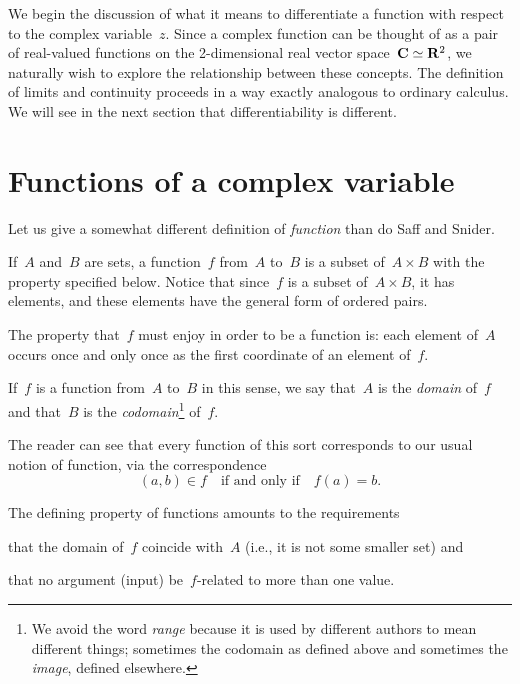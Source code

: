 \documentclass[twocolumn,12pt]{article}
\date{March 1, 2013 (Fri)}
\begin{document}
\makeheader

\begin{summary}
We begin the discussion of what it means to differentiate a function with respect to the complex variable~$z$. Since a complex function can be thought of as a pair of real-valued functions on the 2-dimensional real vector space~$\mathbf{C} \simeq \mathbf{R}^2$, we naturally wish to explore the relationship between these concepts. The definition of limits and continuity proceeds in a way exactly analogous to ordinary calculus. We will see in the next section that differentiability is different.
\end{summary}

\section{Functions of a complex variable}
Let us give a somewhat different definition of \emph{function} than do Saff and Snider.
\begin{definition}
  If~$A$ and~$B$ are sets, a function~$f$ from~$A$ to~$B$ is a subset of~$A \times B$ with the property specified below. Notice that since~$f$ is a subset of~$A \times B$, it has elements, and these elements have the general form of ordered pairs.
  
  The property that~$f$ must enjoy in order to be a function is: each element of~$A$ occurs once and only once as the first coordinate of an element of~$f$.

  If~$f$ is a function from~$A$ to~$B$ in this sense, we say that~$A$ is the \emph{domain} of~$f$ and that~$B$ is the \emph{codomain}\footnote{We avoid the word \emph{range} because it is used by different authors to mean different things; sometimes the codomain as defined above and sometimes the \emph{image}, defined elsewhere.} of~$f$.
\end{definition}
The reader can see that every function of this sort corresponds to our usual notion of function, via the correspondence
\[
  (a, b) \in f \quad \text{if and only if} \quad f(a) = b.
\]
 
The defining property of functions amounts to the requirements
\begin{inparaenum}[(a)]
  \item that the domain of~$f$ coincide with~$A$ (i.e., it is not some smaller set) and
  \item that no argument (input) be~$f$-related to more than one value.
\end{inparaenum}
\end{document}
